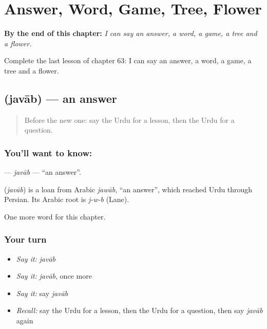 
\chapter{Answer, Word, Game, Tree, Flower}
\label{ch:ur-answer-word-game-tree-flower}

\begin{chapteropening}
\textbf{By the end of this chapter:} \emph{I can say an answer, a word, a game, a tree and a flower.}

Complete the last lesson of chapter 63: I can say an answer, a word, a game, a tree and a flower.
\end{chapteropening}

\section[\texorpdfstring{\ur{جواب} (javāb)}{جواب (javāb)}]{ (javāb) — an answer}

\label{lesson:UR-C63-javab}



\begin{quote}
Before the new one: say the Urdu for a lesson, then the Urdu for a question.
\end{quote}

\subsection*{You'll want to know: }
\textbf{} — \emph{javāb} — \textquotedblleft{}an answer\textquotedblright{}.

\begin{cousinweb}
\textbf{} (\emph{javāb}) is a loan from Arabic \emph{jawāb}, \textquotedblleft{}an answer\textquotedblright{}, which reached Urdu through Persian. Its Arabic root is \emph{j-w-b} (Lane).
\end{cousinweb}

\begin{grammarlens}[title={What you've built}]
One more word for this chapter.
\end{grammarlens}

\subsection*{Your turn}
\begin{itemize}
\raggedright
  \item \emph{Say it:} \emph{javāb}
  \item \emph{Say it:} \emph{javāb}, once more
  \item \emph{Say it:} say \emph{javāb}
  \item \emph{Recall:} say the Urdu for a lesson, then the Urdu for a question, then say \emph{javāb} again
\end{itemize}

